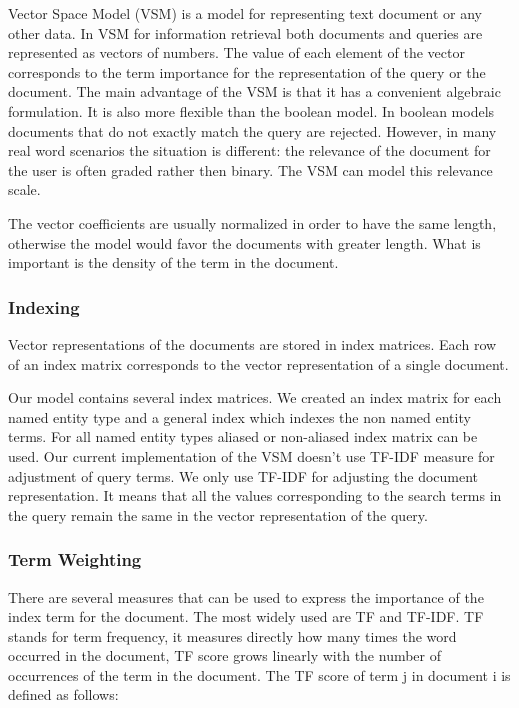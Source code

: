 Vector Space Model (VSM) is a model for representing text document or any other data. In VSM for information retrieval both documents and queries are represented as vectors of numbers. The value of each element of the vector corresponds to the term importance for the representation of the query or the document. The main advantage of the VSM is that it has a convenient algebraic formulation. It is also more flexible than the boolean model. In boolean models documents that do not exactly match the query are rejected. However, in many real word scenarios the situation is different: the relevance of the document for the user is often graded rather then binary. The VSM can model this relevance scale.

The vector coefficients are usually normalized in order to have the same length, otherwise the model would favor the documents with greater length. What is important is the density of the term in the document.

\subsubsection{Indexing}
\label{sec:indexing}
Vector representations of the documents are stored in index matrices. Each row of an index matrix corresponds to the vector representation of a single document. 

Our model contains several index matrices. We created an index matrix for each named entity type and a general index which indexes the non named entity terms. For all named entity types aliased or non-aliased index matrix can be used. Our current implementation of the VSM doesn't use TF-IDF measure for adjustment of query terms. We only use TF-IDF for adjusting the document representation. It means that all the values corresponding to the search terms in the query remain the same in the vector representation of the query. 


\subsubsection{Term Weighting}
\label{sec:term_weighting}
There are several measures that can be used to express the importance of the index term for the document. The most widely used are TF and TF-IDF. 
TF stands for term frequency, it measures directly how many times the word occurred in the document, TF score grows linearly with the number of occurrences of the term in the document. The TF score of term j in document i is defined as follows:

